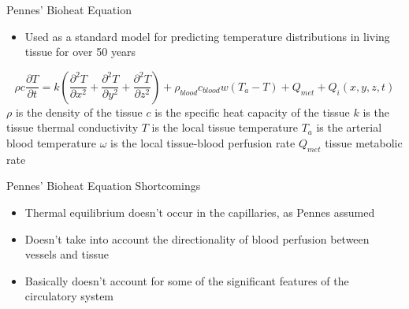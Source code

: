 \documentclass{beamer}
\begin{document}
  \begin{frame}[shrink=10]{Pennes' Bioheat Equation}
  
\begin{itemize}
\item Used as a standard model for predicting temperature distributions in living tissue for over 50 years
\end{itemize}
  
\begin{equation}
\rho c \frac{\partial T}{\partial t} =  k \left( \frac{\partial ^2 T}{\partial x^2} + \frac{\partial ^2 T}{\partial y^2} + \frac{\partial ^2 T}{\partial z^2} \right) + \rho _{blood} c_{blood} w(T_{a} - T) + Q_{met} + Q_i(x,y,z,t)
\end{equation}  
$\rho$ is the density of the tissue
\newline
$c$ is the specific heat capacity of the tissue  
\newline
$k$ is the tissue thermal conductivity
\newline
$T$ is the local tissue temperature
\newline
$T_a$ is the arterial blood temperature
\newline
$\omega$ is the local tissue-blood perfusion rate
\newline
$Q_{met}$ tissue metabolic rate
  
  
  \end{frame}
  
  
  
  
  \begin{frame}{Pennes' Bioheat Equation Shortcomings}
  
\begin{itemize}
\item Thermal equilibrium doesn't occur in the capillaries, as Pennes assumed
\item Doesn't take into account the directionality of blood perfusion between vessels and tissue
\item Basically doesn't account for some of the significant features of the circulatory system
\end{itemize}
  
  \end{frame}
  
\end{document}
